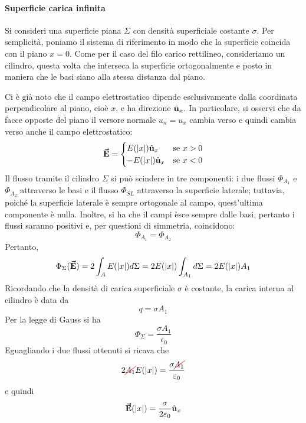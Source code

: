 \paragraph{Superficie carica infinita}
Si consideri una superficie piana $\Sigma$ con densità superficiale costante $\sigma$. Per semplicità, poniamo il sistema di riferimento in modo che la superficie coincida con il piano $x=0$. Come per il caso del filo carico rettilineo, consideriamo un cilindro, questa volta che interseca la superficie ortogonalmente e posto in maniera che le basi siano alla stessa distanza dal piano.

Ci è già noto che il campo elettrostatico dipende esclusivamente dalla coordinata perpendicolare al piano, cioè $x$, e ha direzione $\hat{\mathbf{u}}_x$. In particolare, si osservi che da facce opposte del piano il versore normale $u_n=u_x$ cambia verso e quindi cambia verso anche il campo elettrostatico:
\begin{equation*}
	\vb*{\va{E}}=
	\begin{cases}
		E(\abs{x})\hat{\mathbf{u}}_x&\text{se}\ x>0\\
		-E(\abs{x})\hat{\mathbf{u}}_x&\text{se}\ x<0
	\end{cases}
\end{equation*}
Il flusso tramite il cilindro $\Sigma$ si può scindere in tre componenti: i due flussi $\Phi_{A_1}$ e $\Phi_{A_2}$ attraverso le basi e il flusso $\Phi_{SL}$ attraverso la superficie laterale; tuttavia, poiché la superficie laterale è sempre ortogonale al campo, quest'ultima componente è nulla. Inoltre, si ha che il campi èsce sempre dalle basi, pertanto i flussi saranno positivi e, per questioni di simmetria, coincidono:
\begin{equation}
	\Phi_{A_1}=\Phi_{A_2}
\end{equation}
Pertanto,
\begin{equation*}
	\Phi_{\Sigma}(\vb*{\va{E}})=2\int_A E(\abs{x})d\Sigma=2 E(\abs{x})\int_{A_1}d\Sigma=2E(\abs{x})A_1
\end{equation*}
Ricordando che la densità di carica superficiale $\sigma$ è costante, la carica interna al cilindro è data da
\begin{equation*}
	q=\sigma A_1
\end{equation*}
Per la legge di Gauss si ha
\begin{equation*}
	\Phi_{\Sigma}=\frac{\sigma A_1}{\epsilon_0}
\end{equation*}
Eguagliando i due flussi ottenuti si ricava che
\begin{equation*}
	2\Ccancel[red]{A_1}E(\abs{x})=\frac{\sigma \Ccancel[red]{A_1}}{\epsilon_0}
\end{equation*}
e quindi
\begin{equation}
	\vb*{\va{E}}(\abs{x})=\frac{\sigma}{2\varepsilon_0}\hat{\mathbf{u}}_x
\end{equation}

